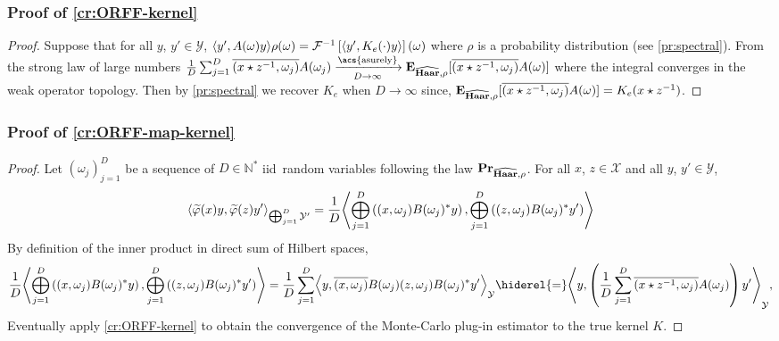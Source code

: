 \subsubsection{Proof of \texorpdfstring{\cref{cr:ORFF-kernel}}{Proposition %
\ref{cr:ORFF-kernel}}}
\begin{proof}
    Suppose that for all $y$, $y'\in\mathcal{Y}$, $\langle y',
    A(\omega)y\rangle\rho(\omega)=\mathcal{F}^{-1}\left[\langle y', K_e(\cdot)y\rangle\right](\omega)$ where $\rho$
    is a probability distribution (see \cref{pr:spectral}). From the strong law
    of large numbers $\frac{1}{D} \sum_{j=1}^D
    \conj{\pairing{x\groupop\inv{z},\omega_j}} A(\omega_j)
    \converges{\acs{asurely}}{D \to \infty} \expectation_{\dual{\Haar},
    \rho}[\conj{\pairing{x \groupop z^{-1}, \omega_j} }A(\omega)]$ where the
    integral converges in the weak operator topology. Then by
    \cref{pr:spectral} we recover $K_e$ when $D\to\infty$ since,
    ${\mathbf{{E}}}_{\widehat{\mathbf{Haar}}, \rho}[\overline{(x \star z^{-1},
    \omega_j)}A(\omega)] = K_e(x\star{z}^{-1})$.
\end{proof}
\subsubsection{Proof of \texorpdfstring{\cref{cr:ORFF-map-kernel}}{%
Proposition~\ref{cr:ORFF-map-kernel}}}
\begin{proof}
    Let $(\omega_j)_{j=1}^D$ be a sequence of $D\in\mathbb{N}^*$
    \ac{iid}~random variables following the law
    ${\mathbf{{Pr}}}_{\widehat{\mathbf{Haar}},\rho}$. For all $x$, $z \in \mathcal{X}$ and
    all $y$, $y' \in \mathcal{Y}$,
    \begin{dmath*}
        \inner*{\tildePhi{\omega}(x)y,\tildePhi{\omega}(z)y'}_{\Vect_{j=1}^D
        \mathcal{Y}'}
        =\frac{1}{D}\inner*{\Vect_{j=1}^D \left(\pairing{x,
        \omega_j}B(\omega_j)^\adjoint y\right), \Vect_{j=1}^D\left(\pairing{z,
        \omega_j}B(\omega_j)^\adjoint y'\right)}
    \end{dmath*}
    By definition of the inner product in direct sum of Hilbert spaces,
    \begin{dmath*}
        \frac{1}{D}\inner*{\Vect_{j=1}^D \left(\pairing{x,
        \omega_j}B(\omega_j)^\adjoint y\right), \Vect_{j=1}^D\left(\pairing{z,
        \omega_j}B(\omega_j)^\adjoint y'\right)}
        = \frac{1}{D} \sum_{j=1}^D \inner*{y, \conj{\pairing{x,
        \omega_j}}B(\omega_j)\pairing{z, \omega_j}B(\omega_j)^\adjoint
        y'}_{\mathcal{Y}}
        \hiderel{=} \inner*{y, \left(\frac{1}{D} \sum_{j=1}^D
        \conj{\pairing{x\groupop \inv{z},
        \omega_j}}A(\omega_j)\right)y'}_{\mathcal{Y}},
    \end{dmath*}
    Eventually apply \cref{cr:ORFF-kernel} to obtain the convergence of the
    Monte-Carlo plug-in estimator to the true kernel $K$.
\end{proof}
